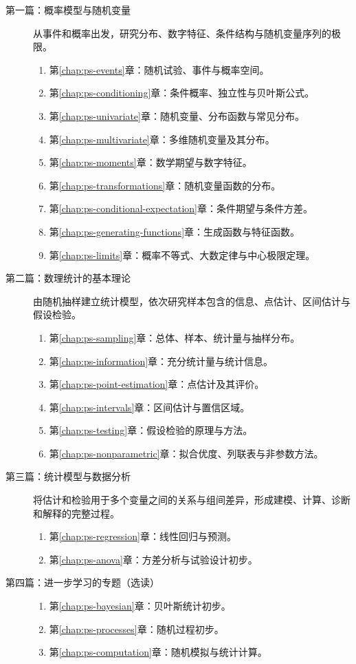 \begin{description}
  \item[第一篇：概率模型与随机变量]
  从事件和概率出发，研究分布、数字特征、条件结构与随机变量序列的极限。
  \begin{enumerate}
    \item 第\ref{chap:ps-events}章：随机试验、事件与概率空间。
    \item 第\ref{chap:ps-conditioning}章：条件概率、独立性与贝叶斯公式。
    \item 第\ref{chap:ps-univariate}章：随机变量、分布函数与常见分布。
    \item 第\ref{chap:ps-multivariate}章：多维随机变量及其分布。
    \item 第\ref{chap:ps-moments}章：数学期望与数字特征。
    \item 第\ref{chap:ps-transformations}章：随机变量函数的分布。
    \item 第\ref{chap:ps-conditional-expectation}章：条件期望与条件方差。
    \item 第\ref{chap:ps-generating-functions}章：生成函数与特征函数。
    \item 第\ref{chap:ps-limits}章：概率不等式、大数定律与中心极限定理。
  \end{enumerate}
  \item[第二篇：数理统计的基本理论]
  由随机抽样建立统计模型，依次研究样本包含的信息、点估计、区间估计与假设检验。
  \begin{enumerate}
    \item 第\ref{chap:ps-sampling}章：总体、样本、统计量与抽样分布。
    \item 第\ref{chap:ps-information}章：充分统计量与统计信息。
    \item 第\ref{chap:ps-point-estimation}章：点估计及其评价。
    \item 第\ref{chap:ps-intervals}章：区间估计与置信区域。
    \item 第\ref{chap:ps-testing}章：假设检验的原理与方法。
    \item 第\ref{chap:ps-nonparametric}章：拟合优度、列联表与非参数方法。
  \end{enumerate}
  \item[第三篇：统计模型与数据分析]
  将估计和检验用于多个变量之间的关系与组间差异，形成建模、计算、诊断和解释的完整过程。
  \begin{enumerate}
    \item 第\ref{chap:ps-regression}章：线性回归与预测。
    \item 第\ref{chap:ps-anova}章：方差分析与试验设计初步。
  \end{enumerate}
  \item[第四篇：进一步学习的专题（选读）]
  \begin{enumerate}
    \item 第\ref{chap:ps-bayesian}章：贝叶斯统计初步。
    \item 第\ref{chap:ps-processes}章：随机过程初步。
    \item 第\ref{chap:ps-computation}章：随机模拟与统计计算。
  \end{enumerate}
\end{description}

